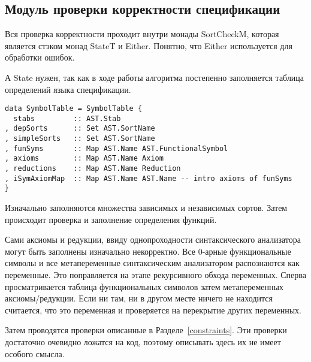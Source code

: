 \subsection{Модуль проверки корректности спецификации}\label{sortcheck}
Вся проверка корректности проходит внутри монады SortCheckM, которая является стэком монад StateT и Either. Понятно, что Either используется для обработки ошибок.

А State нужен, так как в ходе работы алгоритма постепенно заполняется таблица определений языка спецификации.


\begin{lstlisting}[caption={Структура заполняемая модулем проверки спецификации},captionpos=b,frame=single, label={SymTab}]
data SymbolTable = SymbolTable {
  stabs         :: AST.Stab
, depSorts      :: Set AST.SortName
, simpleSorts   :: Set AST.SortName
, funSyms       :: Map AST.Name AST.FunctionalSymbol
, axioms        :: Map AST.Name Axiom
, reductions    :: Map AST.Name Reduction
, iSymAxiomMap  :: Map AST.Name AST.Name -- intro axioms of funSyms
}
\end{lstlisting}


Изначально заполняются множества зависимых и независимых сортов. Затем происходит проверка и заполнение определения функций.

Сами аксиомы и редукции, ввиду однопроходности синтаксического анализатора могут быть заполнены изначально некорректно. Все 0-арные функциональные символы и все метапеременные синтаксическим анализатором распознаются как переменные. Это поправляется на этапе рекурсивного обхода переменных. Сперва просматривается таблица функциональных символов затем метапеременных аксиомы/редукции. Если ни там, ни в другом месте ничего не находится считается, что это переменная и проверяется на перекрытие других переменных.

Затем проводятся проверки описанные в Разделе~\ref{constraints}. Эти проверки достаточно очевидно ложатся на код, поэтому описывать здесь их не имеет особого смысла.




















